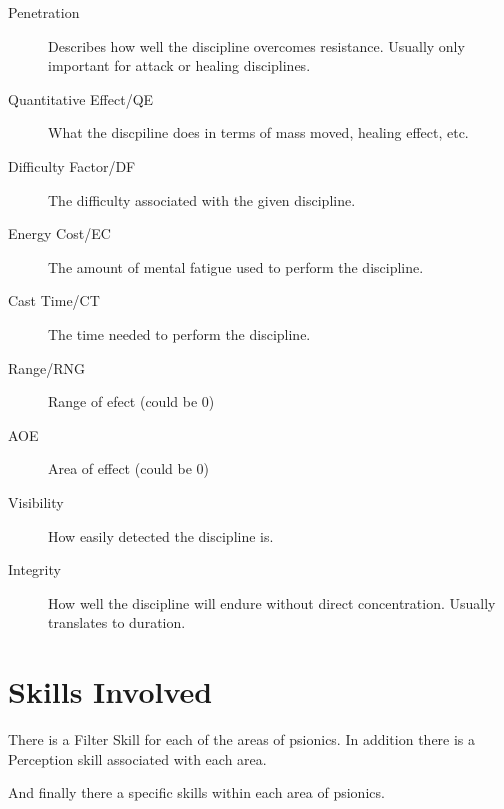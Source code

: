 \documentclass{book}
\begin{document}
\begin{description}

    \item[Penetration]

    Describes how well the discipline overcomes resistance. Usually only
    important for attack or healing disciplines.

    \item[Quantitative Effect/QE]

    What the discpiline does in terms of mass moved, healing effect,
    etc.

    \item[Difficulty Factor/DF]

    The difficulty associated with the given discipline.

    \item[Energy Cost/EC]

    The amount of mental fatigue used to perform the discipline.

    \item[Cast Time/CT]

    The time needed to perform the discipline.

    \item[Range/RNG]

    Range of efect (could be 0)

    \item[AOE]

    Area of effect (could be 0)

    \item[Visibility]

    How easily detected the discipline is.

    \item[Integrity]

    How well the discipline will endure without direct concentration.
    Usually translates to duration.

\end{description}

\section{Skills Involved}

There is a Filter Skill for each of the areas of psionics. 
In addition there is a Perception skill associated with each area.

And finally there a specific skills within each area of psionics.
\end{document}
